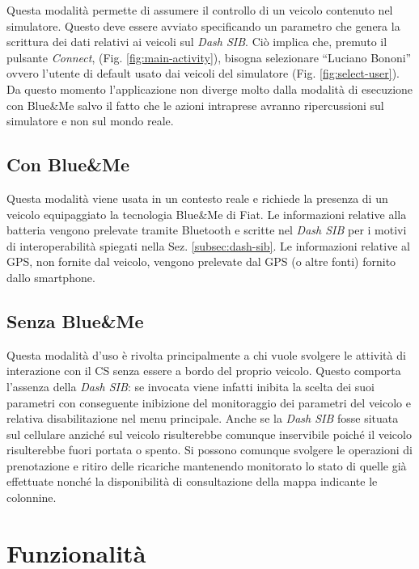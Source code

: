 Questa modalità permette di assumere il controllo di un veicolo contenuto nel simulatore. Questo deve essere avviato specificando un parametro che genera la scrittura dei dati relativi ai veicoli sul \emph{Dash SIB}. Ciò implica che, premuto il pulsante \emph{Connect}, (Fig. \ref{fig:main-activity}), bisogna selezionare ``Luciano Bononi'' ovvero l'utente di default usato dai veicoli del simulatore (Fig. \ref{fig:select-user}). Da questo momento l'applicazione non diverge molto dalla modalità di esecuzione con Blue\&{}Me salvo il fatto che le azioni intraprese avranno ripercussioni sul simulatore e non sul mondo reale.

\subsection{Con Blue\&{}Me}

Questa modalità viene usata in un contesto reale e richiede la presenza di un veicolo equipaggiato la tecnologia Blue\&{}Me di Fiat. Le informazioni relative alla batteria vengono prelevate tramite Bluetooth e scritte nel \emph{Dash SIB} per i motivi di interoperabilità spiegati nella Sez. \ref{subsec:dash-sib}. Le informazioni relative al GPS, non fornite dal veicolo, vengono prelevate dal GPS (o altre fonti) fornito dallo smartphone.

\subsection{Senza Blue\&{}Me}\label{subsec:noblueme}

Questa modalità d'uso è rivolta principalmente a chi vuole svolgere le attività di interazione con il CS senza essere a bordo del proprio veicolo. Questo comporta l'assenza della \emph{Dash SIB}: se invocata viene infatti inibita la scelta dei suoi parametri con conseguente inibizione del monitoraggio dei parametri del veicolo e relativa disabilitazione nel menu principale. Anche se la \emph{Dash SIB} fosse situata sul cellulare anziché sul veicolo risulterebbe comunque inservibile poiché il veicolo risulterebbe fuori portata o spento. Si possono comunque svolgere le operazioni di prenotazione e ritiro delle ricariche mantenendo monitorato lo stato di quelle già effettuate nonché la disponibilità di consultazione della mappa indicante le colonnine.

\section{Funzionalità}

